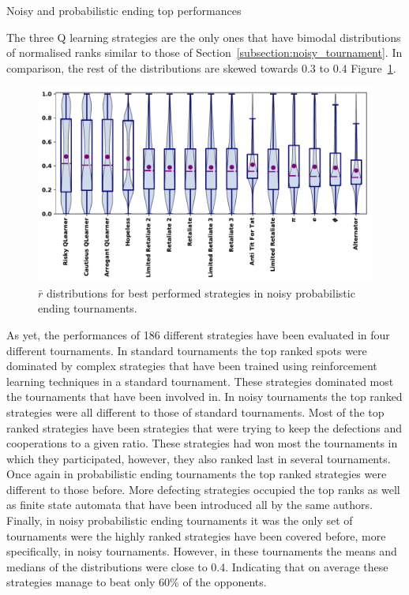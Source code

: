 \documentclass{article}
\begin{document}
\begin{table}[!htbp]
    \centering
    \resizebox{.25\textwidth}{!}{
    }
    \caption{Noisy and probabilistic ending top performances}\label{table:noisy_prob_end_results}
\end{table}

The three Q learning strategies are the only ones that have bimodal
distributions of normalised ranks similar to those of
Section~\ref{subsection:noisy_tournament}. In comparison, the rest of the
distributions are skewed towards 0.3 to 0.4
Figure~\ref{fig:noisy_probend_results}.

\begin{figure}[!htbp]
    \centering
    \includegraphics[width=.7\textwidth]{../images/performance_probend_noise.pdf}
    \caption{\(\bar{r}\) distributions for best performed strategies in noisy
    probabilistic ending tournaments.}
    \label{fig:noisy_probend_results}
\end{figure}

As yet, the performances of 186 different strategies have been evaluated in
four different tournaments. In standard tournaments the top ranked spots were
dominated by complex strategies that have been trained using reinforcement learning
techniques in a standard tournament. These strategies dominated most
the tournaments that have been involved in. In noisy tournaments the top ranked
strategies were all different to those of standard tournaments. Most of the
top ranked strategies have been strategies that were trying to keep the defections
and cooperations to a given ratio. These strategies had won most the tournaments
in which they participated, however, they also ranked last in several tournaments.
Once again in probabilistic ending tournaments the top ranked strategies were
different to those before. More defecting strategies occupied the top ranks
as well as finite state automata that have been introduced all by the same
authors. Finally, in noisy probabilistic ending tournaments it was the only
set of tournaments were the highly ranked strategies have been covered before,
more specifically, in noisy tournaments. However, in these tournaments the means
and medians of the distributions were close to 0.4. Indicating that on average
these strategies manage to beat only 60\% of the opponents.
\end{document}
